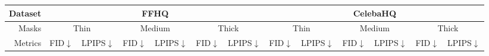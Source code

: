\hspace{-2cm}
\begin{table}[t]
  \scriptsize
  \begin{tabular}{|l|c|c|c|c|c|c|c|c|c|c|c|c|}
  \hline
  \multicolumn{1}{|r|}{Dataset} &
    \multicolumn{6}{c|}{FFHQ} &
    \multicolumn{6}{c|}{CelebaHQ} \\ \hline
  \multicolumn{1}{|r|}{Masks} &
    \multicolumn{2}{c|}{Thin} &
    \multicolumn{2}{c|}{Medium} &
    \multicolumn{2}{c|}{Thick} &
    \multicolumn{2}{c|}{Thin} &
    \multicolumn{2}{c|}{Medium} &
    \multicolumn{2}{c|}{Thick} \\ \hline
  
  \multicolumn{1}{|r|}{Metrics} &
    \multicolumn{1}{c|}{FID$\downarrow$} &
    \multicolumn{1}{c|}{LPIPS$\downarrow$} &
    \multicolumn{1}{c|}{FID$\downarrow$} &
    \multicolumn{1}{c|}{LPIPS$\downarrow$} &
    \multicolumn{1}{c|}{FID$\downarrow$} &
    \multicolumn{1}{c|}{LPIPS$\downarrow$} &
    \multicolumn{1}{c|}{FID$\downarrow$} &
    \multicolumn{1}{c|}{LPIPS$\downarrow$} &
    \multicolumn{1}{c|}{FID$\downarrow$} &
    \multicolumn{1}{c|}{LPIPS$\downarrow$} &
    \multicolumn{1}{c|}{FID$\downarrow$} &
    \multicolumn{1}{c|}{LPIPS$\downarrow$}  \\ \hline
  

\end{tabular}
\end{table}
